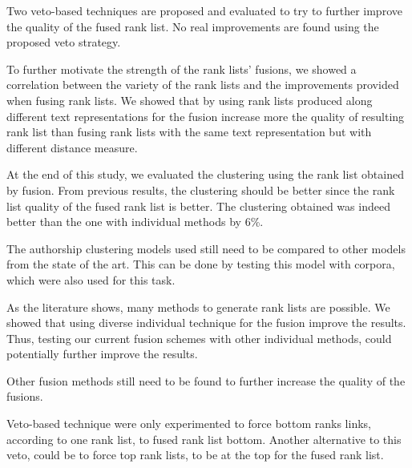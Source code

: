 Two veto-based techniques are proposed and evaluated to try to further improve the quality of the fused rank list.
No real improvements are found using the proposed veto strategy.

To further motivate the strength of the rank lists' fusions, we showed a correlation between the variety of the rank lists and the improvements provided when fusing rank lists.
We showed that by using rank lists produced along different text representations for the fusion increase more the quality of resulting rank list than fusing rank lists with the same text representation but with different distance measure.

At the end of this study, we evaluated the clustering using the rank list obtained by fusion.
From previous results, the clustering should be better since the rank list quality of the fused rank list is better.
The clustering obtained was indeed better than the one with individual methods by 6\%.

The authorship clustering models used still need to be compared to other models from the state of the art.
This can be done by testing this model with corpora, which were also used for this task.

As the literature shows, many methods to generate rank lists are possible.
We showed that using diverse individual technique for the fusion improve the results.
Thus, testing our current fusion schemes with other individual methods, could potentially further improve the results.

Other fusion methods still need to be found to further increase the quality of the fusions.

Veto-based technique were only experimented to force bottom ranks links, according to one rank list, to fused rank list bottom.
Another alternative to this veto, could be to force top rank lists, to be at the top for the fused rank list.
